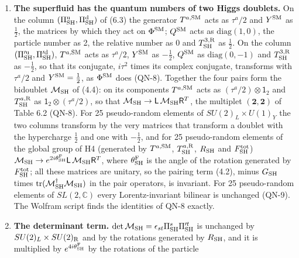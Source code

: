 \documentclass[
  10pt,
]{article}
\providecommand{\tightlist}{%
  \setlength{\itemsep}{0pt}\setlength{\parskip}{0pt}}
\begin{document}
\begin{enumerate}
\def\labelenumi{\arabic{enumi}.}
\tightlist
\item
  \textbf{The superfluid has the quantum numbers of two Higgs doublets.}
  On the column \((\Pi^{\rm u}_{\rm SH},\Pi^{\rm d}_{\rm SH})\) of (6.3)
  the generator \(T^{a,{\rm SM}}\) acts as \(\tau^a/2\) and
  \(Y^{\rm SM}\) as \(\tfrac12\), the matrices by which they act on
  \(\Phi^{\rm SM}\); \(Q^{\rm SM}\) acts as \(\mathrm{diag}(1,0)\), the
  particle number as 2, the relative number as 0 and
  \(T^{3,{\rm R}}_{\rm SH}\) as \(\tfrac12\). On the column
  \((\Pi'^{\rm u}_{\rm SH},\Pi'^{\rm d}_{\rm SH})\), \(T^{a,{\rm SM}}\)
  acts as \(\tau^a/2\), \(Y^{\rm SM}\) as \(-\tfrac12\), \(Q^{\rm SM}\)
  as \(\mathrm{diag}(0,-1)\) and \(T^{3,{\rm R}}_{\rm SH}\) as
  \(-\tfrac12\), so that its conjugate, \(i\tau^2\) times its complex
  conjugate, transforms with \(\tau^a/2\) and \(Y^{\rm SM}=\tfrac12\),
  as \(\Phi^{\rm SM}\) does (QN-8). Together the four pairs form the
  bidoublet \(\mathcal M_{\rm SH}\) of (4.4): on its components
  \(T^{a,{\rm SM}}\) acts as \((\tau^a/2)\otimes\mathsf 1_2\) and
  \(T^{a,{\rm R}}_{\rm SH}\) as \(\mathsf 1_2\otimes(\tau^a/2)\), so
  that
  \(\mathcal M_{\rm SH}\to\mathsf L\,\mathcal M_{\rm SH}\mathsf R^T\),
  the multiplet \((\mathbf 2,\mathbf 2)\) of Table 6.2 (QN-8). For 25
  pseudo-random elements of \(SU(2)_L\times U(1)_Y\) the two columns
  transform by the very matrices that transform a doublet with the
  hypercharge \(\tfrac12\) and one with \(-\tfrac12\), and for 25
  pseudo-random elements of the global group of H4 (generated by
  \(T^{a,{\rm SM}}\), \(T^{a,{\rm R}}_{\rm SH}\), \(R_{\rm SH}\) and
  \(F^{\rm tot}_{\rm SH}\))
  \(\mathcal M_{\rm SH}\to e^{2i\theta^{\rm F}_{\rm SH}}\mathsf L\,\mathcal M_{\rm SH}\mathsf R^T\),
  where \(\theta^{\rm F}_{\rm SH}\) is the angle of the rotation
  generated by \(F^{\rm tot}_{\rm SH}\); all these matrices are unitary,
  so the pairing term (4.2), minus \(G_{\rm SH}\) times
  \(\mathrm{tr}(\mathcal M^\dagger_{\rm SH}\mathcal M_{\rm SH})\) in the
  pair operators, is invariant. For 25 pseudo-random elements of
  \(SL(2,\mathbb C)\) every Lorentz-invariant bilinear is unchanged
  (QN-9). The Wolfram script finds the identities of QN-8 exactly.
\item
  \textbf{The determinant term.}
  \(\det\mathcal M_{\rm SH}=\epsilon_{st}\Pi^s_{\rm SH}\Pi'^t_{\rm SH}\)
  is unchanged by \(SU(2)_L\times SU(2)_{\rm R}\) and by the rotations
  generated by \(R_{\rm SH}\), and it is multiplied by
  \(e^{4i\theta^{\rm F}_{\rm SH}}\) by the rotations of the particle

\end{enumerate}
\end{document}
